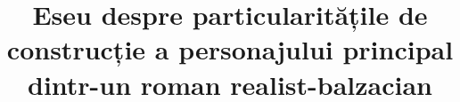 

\title{Eseu despre particularitățile de construcție a personajului principal dintr-un roman realist-balzacian}


 \maketitle %
 

